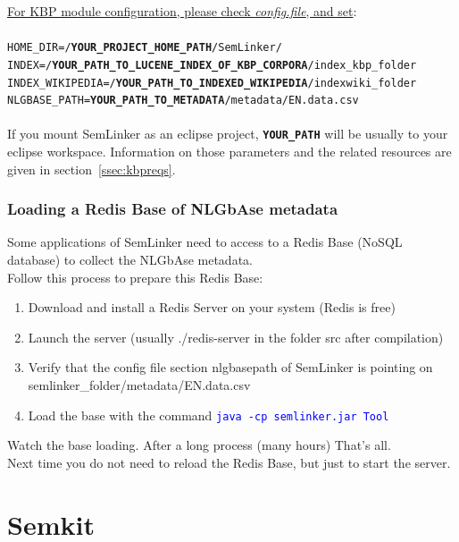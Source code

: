 \documentclass[11pt]{article}
\newcommand{\seml}{SemLinker}
\newcommand{\semk}{Semkit}
\begin{document}
\noindent\underline{For KBP module configuration, please check \textit{config.file}, and set}:\\
\\
\texttt{HOME\_DIR=/\textbf{YOUR\_PROJECT\_HOME\_PATH}/SemLinker/}\\
\texttt{INDEX=/\textbf{YOUR\_PATH\_TO\_LUCENE\_INDEX\_OF\_KBP\_CORPORA}/index\_kbp\_folder}\\
\texttt{INDEX\_WIKIPEDIA=/\textbf{YOUR\_PATH\_TO\_INDEXED\_WIKIPEDIA}/indexwiki\_folder}\\
\texttt{NLGBASE\_PATH=\textbf{YOUR\_PATH\_TO\_METADATA}/metadata/EN.data.csv}\\
\\
If you mount \seml{} as an eclipse project, \texttt{\textbf{YOUR\_PATH}} will be usually to your eclipse workspace.
Information on those parameters and the related resources are given in section~\ref{ssec:kbpreqs}.


\subsubsection{Loading a Redis Base of NLGbAse metadata}
\label{sssec:redisdb}
Some applications of \seml{} need to access to a Redis Base (NoSQL database) to collect the NLGbAse metadata. \\
Follow this process to prepare this Redis Base:
\begin{enumerate}
 \item Download and install a Redis Server on your system (Redis is free)
 \item Launch the server (usually ./redis-server in the folder src after compilation)
 \item Verify that the config file section nlgbasepath of \seml{} is pointing on\\{semlinker\_folder}/metadata/EN.data.csv
 \item Load the base with the command \texttt{\textcolor{blue}{java -cp semlinker.jar Tool}}
\end{enumerate}

\noindent Watch the base loading. 
After a long process (many hours) That’s all.\\
Next time you do not need to reload the Redis Base, but just to start the server.


\section{\semk{}}
\label{sec:semk}
\end{document}
